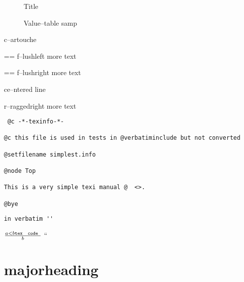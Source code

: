 \documentclass{book}
\makeatletter
\newcommand\GNUTexinfotablestylesamp[1]{\ifstrempty{#1}{}{`\texttt{#1}'}}%
\newenvironment{GNUTexinfopreformatted}{%
  \par\GNUTobeylines\obeyspaces\frenchspacing
  \parskip=\z@\parindent=\z@}{}
{\catcode`\^^M=13 \gdef\GNUTobeylines{\catcode`\^^M=13 \def^^M{\null\par}}}
\newcommand{\GNUTexinfoplaceholder}[1]{}
\newcommand{\GNUTexinfonopagebreakheading}[2]{{\let\clearpage\relax \let\cleardoublepage\relax \let\thispagestyle\GNUTexinfoplaceholder #1{#2}}}
\makeatother
\begin{document}
\begin{titlepage}
\begin{description}
\item[] Title
\item[{\parbox[b]{\linewidth}{%
\GNUTexinfotablestylesamp{a{-}{-}samp}\\
\GNUTexinfotablestylesamp{a2{-}{-}samp}}}]
Value--table samp
\end{description}

\begin{mdframed}[style=GNUTexinfocartouche]
c--artouche
\end{mdframed}

\begin{flushleft}
\begin{GNUTexinfopreformatted}%
f--lushleft
more text
\end{GNUTexinfopreformatted}
\end{flushleft}

\begin{flushright}
\begin{GNUTexinfopreformatted}%
f--lushright
more text
\end{GNUTexinfopreformatted}
\end{flushright}

\begin{center}
ce--ntered line
\end{center}

\begin{flushleft}
r--raggedright
more text
\end{flushleft}

\begin{verbatim}
 @c -*-texinfo-*-

@c this file is used in tests in @verbatiminclude but not converted

@setfilename simplest.info

@node Top

This is a very simple texi manual @  <>.

@bye
\end{verbatim}

\begin{verbatim}
in verbatim ''
\end{verbatim}





$\frac{a < b \texttt{tex \hbox{ code }}}{b}$ ``

\GNUTexinfonopagebreakheading{\chapter*}{{majorheading}}


\end{titlepage}
\end{document}
